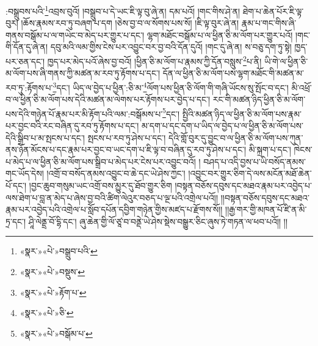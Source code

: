 :བསྒྲུབས་པའི་\footnote{«སྣར་»«པེ་»བསྒྲུབ་པའི་}འབྲས་བུའོ། །བསྒྲུབ་པ་དེ་ཡང་ཇི་ལྟ་བུ་ཞེ་ན། དམ་པའོ། །གང་གིས་ཤེ་ན། ཐེག་པ་ཆེན་པོར་ཇི་ལྟ་བུར། །ཆོས་རྣམས་རབ་ཏུ་བཞག་པ་དག །ཅེས་བྱ་བ་ལ་སོགས་པས་སོ། །ཇི་ལྟ་བུར་ཞེ་ན། རྣམ་པ་གང་གིས་ཞི་གནས་བསྒོམ་པ་ལ་གཡེང་བ་མེད་པར་གྱུར་པ་དང་། ལྷག་མཐོང་བསྒོམ་པ་ལ་ཕྱིན་ཅི་མ་ལོག་པར་གྱུར་པའོ། །གང་གི་དོན་དུ་ཞེ་ན། དབུ་མའི་ལམ་གྱིས་ངེས་པར་འབྱུང་བར་བྱ་བའི་དོན་དུའོ། །གང་དུ་ཞེ་ན། ས་བཅུ་དག་ཏུ་སྟེ། ཁྱད་པར་ཅན་དང་། ཁྱད་པར་མེད་པའོ་ཞེས་བྱ་བའོ། །ཕྱིན་ཅི་མ་ལོག་པ་རྣམས་ཀྱི་དོན་བསླུས་\footnote{«སྣར་»«པེ་»བསྡུས་}པ་ནི། ཡི་གེ་ལ་ཕྱིན་ཅི་མ་ལོག་པས་ཞི་གནས་ཀྱི་མཚན་མ་རབ་ཏུ་རྟོགས་པ་དང་། དོན་ལ་ཕྱིན་ཅི་མ་ལོག་པས་ལྷག་མཐོང་གི་མཚན་མ་རབ་ཏུ་:རྟོགས་པ་\footnote{«སྣར་»«པེ་»རྟོག་པ་}དང་། ཡིད་ལ་བྱེད་པ་ཕྱིན་:ཅི་མ་\footnote{«སྣར་»«པེ་»ཅི་}ལོག་པས་ཕྱིན་ཅི་ལོག་གི་གཞི་ཡོངས་སུ་སྤོང་བ་དང་། མི་འཕྲོ་བ་ལ་ཕྱིན་ཅི་མ་ལོག་པས་དེའི་མཚན་མ་ལེགས་པར་རྟོགས་པར་བྱེད་པ་དང་། རང་གི་མཚན་ཉིད་ཕྱིན་ཅི་མ་ལོག་པས་དེའི་གཉེན་པོ་རྣམ་པར་མི་རྟོག་པའི་ལམ་:བསྒོམས་པ་\footnote{«སྣར་»«པེ་»བསྒོམ་པ་}དང་། སྤྱིའི་མཚན་ཉིད་ལ་ཕྱིན་ཅི་མ་ལོག་པས་རྣམ་པར་བྱང་བའི་རང་བཞིན་དུ་རབ་ཏུ་རྟོགས་པ་དང་། མ་དག་པ་དང་དག་པ་ཡིད་ལ་བྱེད་པ་ལ་ཕྱིན་ཅི་མ་ལོག་པས་དེའི་སྒྲིབ་པ་མ་སྤངས་པ་དང་། སྤངས་པ་རབ་ཏུ་ཤེས་པ་དང་། དེའི་གློ་བུར་དུ་བྱུང་བ་ལ་ཕྱིན་ཅི་མ་ལོག་པས་ཀུན་ནས་ཉོན་མོངས་པ་དང་རྣམ་པར་བྱང་བ་ཡང་དག་པ་ཇི་ལྟ་བ་བཞིན་དུ་རབ་ཏུ་ཤེས་པ་དང་། མི་སྐྲག་པ་དང་། ཁེངས་པ་མེད་པ་ལ་ཕྱིན་ཅི་མ་ལོག་པས་སྒྲིབ་པ་མེད་པར་ངེས་པར་འབྱུང་བའོ། །
བཤད་པ་འདི་བྱས་པ་ཡི་བསོད་ནམས་གང་ཡོད་དེས། །འགྲོ་བ་བསོད་ནམས་འབྱུང་བ་ཆེ་དང་ཡེ་ཤེས་ཀྱང་། །འབྱུང་བར་གྱུར་ཅིག་དེ་ལས་མངོན་མཐོ་ཆེན་པོ་དང་། །བྱང་ཆུབ་གསུམ་ཡང་འགྲོ་བས་མྱུར་དུ་ཐོབ་གྱུར་ཅིག །བསྟན་བཅོས་དབུས་དང་མཐའ་རྣམ་པར་འབྱེད་པ་ལས་ཐེག་པ་བླ་ན་མེད་པ་ཞེས་བྱ་བའི་ཚིག་ལེའུར་བཅད་པ་ལྔ་པའི་འགྲེལ་པའོ།། །།བསྟན་བཅོས་དབུས་དང་མཐའ་རྣམ་པར་འབྱེད་པའི་འགྲེལ་པ་སློབ་དཔོན་དབྱིག་གཉེན་གྱིས་མཛད་པ་རྫོགས་སོ།། །།རྒྱ་གར་གྱི་མཁན་པོ་ཛི་ན་མི་ཏྲ་དང་། ཤཱི་ལེནྡྲ་བོ་དྷི་དང་། ཞུ་ཆེན་གྱི་ལོ་ཙཱ་བ་བནྡེ་ཡེ་ཤེས་སྡེས་བསྒྱུར་ཅིང་ཞུས་ཏེ་གཏན་ལ་ཕབ་པའོ།། །།